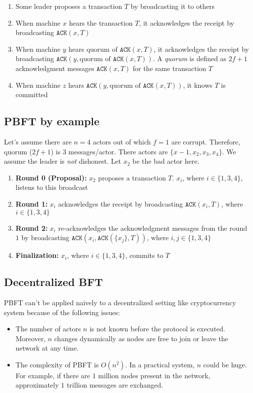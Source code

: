 \documentclass[twoside]{article}
\begin{document}
\begin{enumerate}
	\item Some leader proposes a transaction $T$ by broadcasting it to others
	\item When machine $x$ hears the transaction $T$, it acknowledges the receipt by broadcasting $\texttt{ACK}(x, T)$
	\item When machine $y$ hears quorum of $\texttt{ACK}(x, T)$, it acknowledges the receipt by broadcasting $\texttt{ACK}(y, \text{quorum of } \texttt{ACK}(x, T))$.
	A \textit{quorum} is defined as $2f + 1$ acknowledgment messages $\texttt{ACK}(x, T)$ for the same transaction $T$
	\item When machine $z$ hears $\texttt{ACK}(y, \text{quorum of } \texttt{ACK}(x, T))$, it knows $T$ is committed
\end{enumerate}


\subsection{PBFT by example}
Let's assume there are $n=4$ actors out of which $f=1$ are corrupt.
Therefore, quorum ($2f + 1$) is $3$ messages/actor.
There actors are $\{x-1, x_2, x_3, x_4\}$.
We assume the leader is \textit{not} dishonest.
Let $x_2$ be the bad actor here.

\begin{enumerate}
	\item \textbf{Round 0 (Proposal): } $x_2$ proposes a transaction $T$.
	$x_i$, where $i \in \{1, 3, 4\}$, listens to this broadcast
	\item \textbf{Round 1: } $x_i$ acknowledges the receipt by broadcasting $\texttt{ACK}(x_i, T)$, where $i \in \{1, 3, 4\}$
	\item \textbf{Round 2: } $x_i$ re-acknowledges the acknowledgment messages from the round $1$ by broadcasting $\texttt{ACK}(x_i, \texttt{ACK}(\{x_j\}, T))$, where $i, j \in \{1, 3, 4\}$
	\item \textbf{Finalization:} $x_i$, where $i \in \{1, 3, 4\}$, commits to $T$
\end{enumerate}


\subsection{Decentralized BFT}
PBFT can't be applied naively to a decentralized setting like cryptocurrency system because of the following issues:

\begin{itemize}
	\item The number of actors $n$ is not known before the protocol is executed.
	Moreover, $n$ changes dynamically as nodes are free to join or leave the network at any time.
	\item The complexity of PBFT is $O(n^2)$.
	In a practical system, $n$ could be huge.
	For example, if there are $1$ million nodes present in the network, approximately $1$ trillion messages are exchanged.
\end{itemize}
\end{document}
